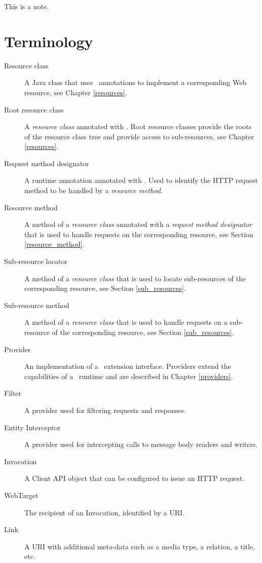 \begin{nnnote*}
This is a note.
\end{nnnote*}

\section{Terminology}
\label{terminology}

\begin{description}
\item[Resource class] A Java class that uses \jaxrs\ annotations to implement a corresponding Web resource, see Chapter \ref{resources}.
\item[Root resource class] A {\em resource class} annotated with \Path. Root resource classes provide the roots of the resource class tree and provide access to sub-resources, see Chapter \ref{resources}.
\item[Request method designator] A runtime annotation annotated with \HttpMethod. Used to identify the HTTP request method to be handled by a {\em resource method}.
\item[Resource method] A method of a {\em resource class} annotated with a {\em request method designator} that is used to handle requests on the corresponding resource, see Section \ref{resource_method}.
\item[Sub-resource locator] A method of a {\em resource class} that is used to locate sub-resources of the corresponding resource, see Section \ref{sub_resources}.
\item[Sub-resource method] A method of a {\em resource class} that is used to handle requests on a sub-resource of the corresponding resource, see Section \ref{sub_resources}.
\item[Provider] An implementation of a \jaxrs\ extension interface. Providers extend the capabilities of a \jaxrs\ runtime and are described in Chapter \ref{providers}.
\item[Filter] A provider used for filtering requests and responses.
\item[Entity Interceptor] A provider used for intercepting calls to message body readers and writers.
\item[Invocation] A Client API object that can be configured to issue an HTTP request.
\item[WebTarget] The recipient of an Invocation, identified by a URI.
\item[Link] A URI with additional meta-data such as a media type, a relation, a title, etc.

\end{description}

